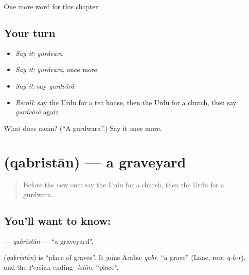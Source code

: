 \begin{grammarlens}[title={What you've built}]
One more word for this chapter.
\end{grammarlens}

\subsection*{Your turn}
\begin{itemize}
\raggedright
  \item \emph{Say it:} \emph{gurdvārā}
  \item \emph{Say it:} \emph{gurdvārā}, once more
  \item \emph{Say it:} say \emph{gurdvārā}
  \item \emph{Recall:} say the Urdu for a tea house, then the Urdu for a church, then say \emph{gurdvārā} again
\end{itemize}

\begin{tcolorbox}[breakable,colback=teal!4,colframe=teal!35!black,title={Before you move on}]
What does  mean? (\textquotedblleft{}A gurdwara\textquotedblright{}.) Say it once more.
\end{tcolorbox}
\section[\texorpdfstring{\ur{قبرستان} (qabristān)}{قبرستان (qabristān)}]{ (qabristān) — a graveyard}

\label{lesson:UR-C191-qabristan}



\begin{quote}
Before the new one: say the Urdu for a church, then the Urdu for a gurdwara.
\end{quote}

\subsection*{You'll want to know: }
\textbf{} — \emph{qabristān} — \textquotedblleft{}a graveyard\textquotedblright{}.

\begin{cousinweb}
\textbf{} (\emph{qabristān}) is \textquotedblleft{}place of graves\textquotedblright{}. It joins Arabic \emph{qabr}, \textquotedblleft{}a grave\textquotedblright{} (Lane, root \emph{q-b-r}), and the Persian ending \emph{-istān}, \textquotedblleft{}place\textquotedblright{}.
\end{cousinweb}

